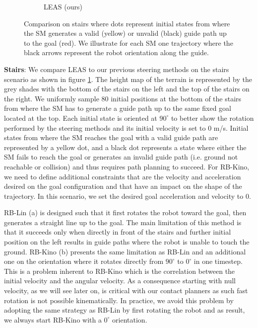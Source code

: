\begin{figure}
\begin{subfigure}[t]{0.49\linewidth}
    \caption{LEAS (ours)}
    \end{subfigure}
    \caption{Comparison on stairs where dots represent initial states from where the SM generates a valid (yellow) or unvalid (black) guide path up to the goal (red). We illustrate for each SM one trajectory where the black arrows represent the robot orientation along the guide.}
    \label{fig:stairs_p1}
\end{figure}

\textbf{Stairs}: We compare LEAS to our previous steering methods on the stairs scenario as shown in figure \ref{fig:stairs_p1}. The height map of the terrain is represented by the grey shades with the bottom of the stairs on the left and the top of the stairs on the right. We uniformly sample 80 initial positions at the bottom of the stairs from where the SM has to generate a guide path up to the same fixed goal located at the top. Each initial state is oriented at $90^{\circ}$ to better show the rotation performed by the steering methods and its initial velocity is set to $0$ m/s. 
Initial states from where the SM reaches the goal with a valid guide path are represented by a yellow dot, and a black dot represents a state where either the SM fails to reach the goal or generates an invalid guide path (i.e. ground not reachable or collision) and thus requires path planning to succeed. 
For RB-Kino, we need to define additional constraints that are the velocity and acceleration desired on the goal configuration and that have an impact on the shape of the trajectory. In this scenario, we set the desired goal acceleration and velocity to $0$.

RB-Lin (a) is designed such that it first rotates the robot toward the goal, then generates a straight line up to the goal. The main limitation of this method is that it succeeds only when directly in front of the stairs and further initial position on the left results in guide paths where the robot is unable to touch the ground.
RB-Kino (b) presents the same limitation as RB-Lin and an additional one on the orientation where it rotates directly from $90^{\circ}$ to $0^{\circ}$ in one timestep. This is a problem inherent to RB-Kino which is the correlation between the initial velocity and the angular velocity. As a consequence starting with null velocity, as we will see later on, is critical with our contact planners as such fast rotation is not possible kinematically. 
In practice, we avoid this problem by adopting the same strategy as RB-Lin by first rotating the robot and as result, we always start RB-Kino with a $0^{\circ}$ orientation.

